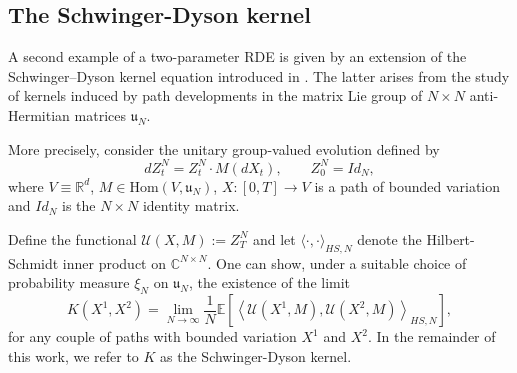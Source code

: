 \documentclass{article}%
\begin{document}

\subsection{The Schwinger-Dyson kernel}
A second example of a two-parameter RDE is given by an extension of the Schwinger--Dyson kernel equation introduced in \cite{cass2024free}. The latter arises from the study of kernels induced by path developments in the matrix Lie group of $N \times N$ anti-Hermitian matrices $\mathfrak{u}_N$. 

More precisely, consider the unitary group-valued evolution defined by
\begin{equation*}
dZ^N_t = Z^N_t \cdot M(dX_t), \qquad Z^N_0 = Id_N,
\end{equation*}
where $V \equiv \mathbb{R}^d$, $M \in \mathrm{Hom}(V, \mathfrak{u}_N)$, $X \colon [0,T] \to V$ is a path of bounded variation and $Id_N$ is the $N \times N$ identity matrix.

Define the functional $\mathcal{U}(X,M) := Z^N_T$ and let $\langle \cdot, \cdot  \rangle_{HS,N }$ denote the Hilbert-Schmidt inner product on $\mathbb{C}^{N \times N }$. One can show, under a suitable choice of probability measure $\xi_N$ on $\mathfrak{u}_N$, the existence of the limit
\begin{equation}\label{SD_kernel_definition}
K(X^1, X^2) = \lim_{N \to \infty} \frac{1}{N} \mathbb{E}\!\left[ \left\langle \mathcal{U}(X^1, M), \mathcal{U}(X^2, M) \right\rangle_{HS, N} \right],
\end{equation}
for any couple of paths with bounded variation $X^1$ and $X^2$. In the remainder of this work, we refer to $K$ as the Schwinger-Dyson kernel.
\end{document}

